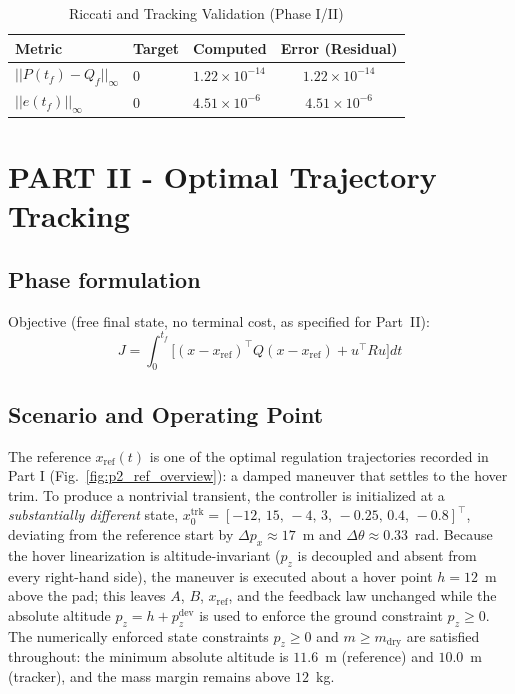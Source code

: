 \documentclass[letterpaper, 10 pt, conference]{ieeeconf}
\begin{document}
\begin{itemize}
        \begin{table}[H]
        \centering
        \footnotesize
        \caption{Riccati and Tracking Validation (Phase I/II)}
        \label{tab:val_p1}
        \begin{tabular}{@{}lllc@{}}
        \toprule
        Metric & Target & Computed & Error (Residual) \\ \midrule
        $||P(t_f) - Q_f||_\infty$ & $0$ & $1.22 \times 10^{-14}$ & $1.22 \times 10^{-14}$ \\
        $||e(t_f)||_\infty$ & $0$ & $4.51 \times 10^{-6}$ & $4.51 \times 10^{-6}$ \\
        \bottomrule
        \end{tabular}
        \end{table}
        
\end{itemize}
        

\newpage
\section{PART II - Optimal Trajectory Tracking}

\subsection{Phase formulation}

Objective (free final state, no terminal cost, as specified for Part~II):
\[
    J = \int_{0}^{t_f} \Big[ (x - x_{\text{ref}})^\top Q (x - x_{\text{ref}}) + u^\top R u \Big] dt
\]

\subsection{Scenario and Operating Point}

The reference $x_{\text{ref}}(t)$ is one of the optimal regulation trajectories recorded in Part I (Fig.~\ref{fig:p2_ref_overview}): a damped maneuver that settles to the hover trim. To produce a nontrivial transient, the controller is initialized at a \emph{substantially different} state, $x_0^{\text{trk}} = [-12,\,15,\,-4,\,3,\,-0.25,\,0.4,\,-0.8]^\top$, deviating from the reference start by $\Delta p_x \approx 17$~m and $\Delta\theta \approx 0.33$~rad. Because the hover linearization is altitude-invariant ($p_z$ is decoupled and absent from every right-hand side), the maneuver is executed about a hover point $h = 12$~m above the pad; this leaves $A$, $B$, $x_{\text{ref}}$, and the feedback law unchanged while the absolute altitude $p_z = h + p_z^{\text{dev}}$ is used to enforce the ground constraint $p_z \geq 0$. The numerically enforced state constraints $p_z \geq 0$ and $m \geq m_{\text{dry}}$ are satisfied throughout: the minimum absolute altitude is $11.6$~m (reference) and $10.0$~m (tracker), and the mass margin remains above $12$~kg.
\end{document}
